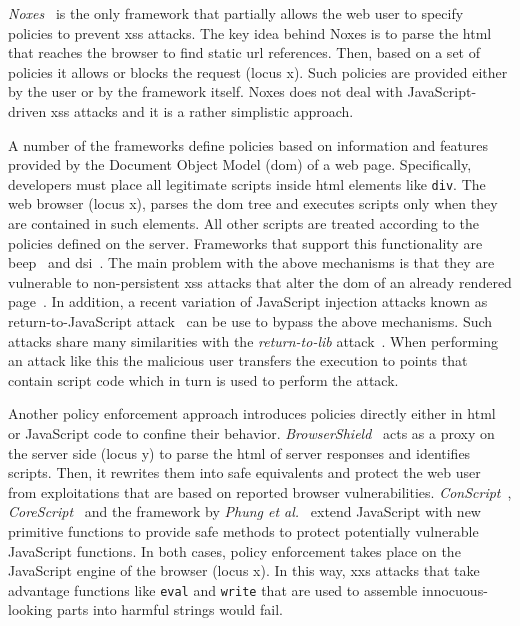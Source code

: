 \documentclass[conference]{IEEEtran}
\begin{document}
{\it Noxes}~\cite{KKVJ06,KJKV09} is the only
framework that partially allows the web
user to specify policies to prevent {\sc xss} attacks.
The key idea behind Noxes is to parse
the {\sc html} that reaches the browser to
find static {\sc url} references. Then, based on
a set of policies it allows or blocks
the request (locus {\sc x}). Such policies
are provided either by the user or by
the framework itself. Noxes does not
deal with JavaScript-driven {\sc xss}
attacks and it is a rather simplistic approach.

A number of the frameworks define policies
based on information and features provided by
the Document Object Model ({\sc dom}) of a web page.
Specifically, developers must place all legitimate
scripts inside {\sc html} elements like {\tt div}.
The web browser (locus {\sc x}), parses the
{\sc dom} tree and executes scripts only when they
are contained in such elements. All other scripts
are treated according to the policies defined
on the server. Frameworks that support this
functionality are {\sc beep}~\cite{TNH07}
and {\sc dsi}~\cite{NSS06}. The main problem with
the above mechanisms is that they are vulnerable
to non-persistent {\sc xss} attacks that alter
the {\sc dom} of an already rendered
page~\cite{APKLM10}.
In addition, a recent variation of JavaScript
injection attacks known as return-to-JavaScript
attack~\cite{APKLM10} can be use to bypass
the above mechanisms. Such attacks share
many similarities with the {\it return-to-lib}
attack~\cite{SPPGMMB04}. When performing an
attack like this the malicious user transfers the
execution to points that contain script
code which in turn is used to perform the attack.

Another policy enforcement approach introduces
policies directly either in {\sc html} or JavaScript code
to confine their behavior. {\it BrowserShield}~\cite{RDWDE07}
acts as a proxy on the server side (locus {\sc y}) to
parse the {\sc html} of server responses and identifies
scripts. Then, it rewrites them into safe equivalents
and protect the web user from exploitations
that are based on reported browser vulnerabilities.
{\it ConScript}~\cite{ML10}, {\it CoreScript}~\cite{YCIS07}
and the framework by {\it Phung et al.}~\cite{PSC09}
extend JavaScript with new primitive functions to
provide safe methods to protect potentially vulnerable
JavaScript functions. In both cases, policy enforcement takes
place on the JavaScript engine of the browser (locus {\sc x}).
In this way, {\sc xxs} attacks that take advantage
functions like {\tt eval} and {\tt write} that are
used to assemble innocuous-looking parts into harmful
strings would fail.
\end{document}
